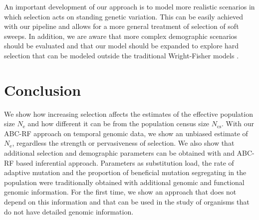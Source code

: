 \documentclass[a4paper, 12pt]{article}
\begin{document}
An important development of our approach is to model more realistic scenarios in which selection acts on standing genetic variation. This can be easily achieved with our pipeline and allows for a more general treatment of selection of soft sweeps. In addition, we are aware that more complex demographic scenarios should be evaluated and that our model should be expanded to explore hard selection that can be modeled outside the traditional Wright-Fisher models \citep{Haller:2019cy}.

\section*{Conclusion}
We show how increasing selection affects the estimates of the effective population size $N_{\mathrm{e}}$ and how different it can be from the population census size $N_{\mathrm{cs}}$. With our ABC-RF approach on temporal genomic data, we show an unbiased estimate of $N_{\mathrm{e}}$, regardless the strength or pervasiveness of selection. We also show that additional selection and demographic parameters can be obtained with and ABC-RF based inferential approach. Parameters as substitution load, the rate of adaptive mutation and the proportion of beneficial mutation segregating in the population were traditionally obtained with additional genomic and functional genomic information. For the first time, we show an approach that does not depend on this information and that can be used in the study of organisms that do not have detailed genomic information.



\end{document}
